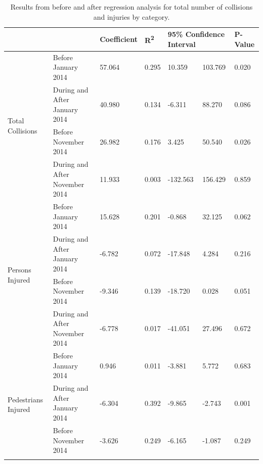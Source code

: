 \documentclass[10pt,journal,compsoc]{IEEEtran}
\begin{document}
\begin{table}[]
\centering
\caption{Results from before and after regression analysis for total number of collisions and injuries by category. }
\label{tab:ana}
\begin{tabular}{|l|l|l|l|l|l|l|}
\hline
                                     &            & Coefficient & R\textsuperscript{2}    & \multicolumn{2}{l|}{95\% Confidence Interval} & P-Value \\ \hline
\multirow{4}{*}{Total Collisions}    & Before January 2014 & 57.064      & 0.295 & 10.359                 & 103.769              & 0.020   \\ \cline{2-7} 
                                     & During and After January 2014  & 40.980      & 0.134 & -6.311                 & 88.270               & 0.086   \\ \cline{2-7} 
                                     & Before November 2014 & 26.982      & 0.176 & 3.425                  & 50.540                & 0.026  \\ \cline{2-7} 
                                     & During and After November 2014  & 11.933      & 0.003 & -132.563               & 156.429              & 0.859   \\ \hline
\multirow{4}{*}{Persons Injured}     & Before January 2014 & 15.628      & 0.201 & -0.868                 & 32.125               & 0.062   \\ \cline{2-7} 
                                     & During and After January 2014  & -6.782      & 0.072 & -17.848                & 4.284                & 0.216   \\ \cline{2-7} 
                                     & Before November 2014 & -9.346      & 0.139 & -18.720                & 0.028                & 0.051   \\ \cline{2-7} 
                                     & During and After November 2014  & -6.778      & 0.017 & -41.051                & 27.496               & 0.672   \\ \hline
\multirow{4}{*}{Pedestrians Injured} & Before January 2014 & 0.946       & 0.011 & -3.881                 & 5.772                & 0.683   \\ \cline{2-7} 
                                     & During and After January 2014  & -6.304      & 0.392 & -9.865                 & -2.743               & 0.001   \\ \cline{2-7} 
                                     & Before November 2014 & -3.626      & 0.249 & -6.165                 & -1.087               & 0.249   \\ \cline{2-7} 

\end{tabular}
\end{table}
\end{document}
